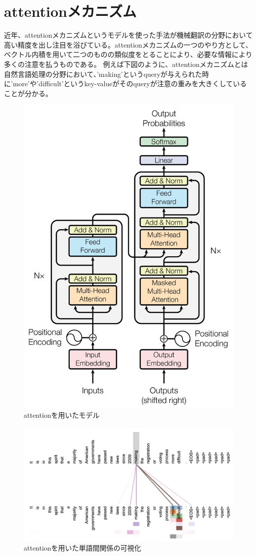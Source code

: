 \section{attentionメカニズム}
近年、attentionメカニズムというモデルを使った手法\cite{bahdanau2014neural}\cite{attention}が機械翻訳の分野において高い精度を出し注目を浴びている。attentionメカニズムの一つのやり方として、ベクトル内積を用いて二つのものの類似度をとることにより、必要な情報により多くの注意を払うものである。
例えば下図のように、attentionメカニズムとは自然言語処理の分野において、'making'というqueryが与えられた時に'more'や'difficult'というkey-valueがそのqueryが注意の重みを大きくしていることが分かる。

\begin{figure}[h]
  \centering
  \includegraphics[width=0.5\hsize]{figures/attention_mechanism.pdf}
  \caption{attentionを用いたモデル\cite{attention}}
  \label{fig:ex1}
\end{figure}

\begin{figure}[h]
  \centering
  \includegraphics[width=1.0\hsize]{figures/attention_visualization.pdf}
  \caption{attentionを用いた単語間関係の可視化\cite{attention}}
  \label{fig:ex1}
\end{figure}
\newpage{}
